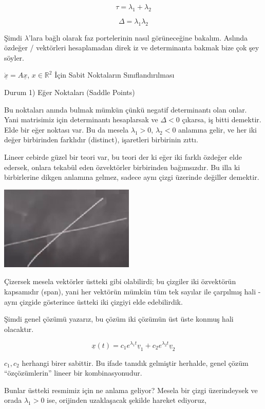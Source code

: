 \documentclass[12pt,fleqn]{article}\usepackage{../../common}
\begin{document}
$$ \tau = \lambda_1 + \lambda_2 $$

$$ \Delta = \lambda_1 \lambda_2 $$

Şimdi $\lambda$'lara bağlı olarak faz portelerinin nasıl görüneceğine
bakalım. Aslında özdeğer / vektörleri hesaplamadan direk iz ve determinanta
bakmak bize çok şey söyler. 

$\dot{\underline{x}}= A \underline{x}$, $x \in \mathbb{R}^2$ İçin Sabit Noktaların
Sınıflandırılması

Durum 1) Eğer Noktaları (Saddle Points)

Bu noktaları anında bulmak mümkün çünkü negatif determinantı olan onlar. Yani
matrisimiz için determinantı hesaplarsak ve $\Delta < 0$ çıkarsa, iş bitti
demektir. Elde bir eğer noktası var. Bu da mesela $\lambda_1 > 0$, $\lambda_2<0$
anlamına gelir, ve her iki değer birbirinden farklıdır (distinct), işaretleri
birbirinin zıttı.

Lineer cebirde güzel bir teori var, bu teori der ki eğer iki farklı özdeğer elde
edersek, onlara tekabül eden özvektörler birbirinden bağımsızdır. Bu illa ki
birbirlerine dikgen anlamına gelmez, sadece aynı çizgi üzerinde değiller
demektir. 

\includegraphics[height=4cm]{05_07.png}

Çizersek mesela vektörler üstteki gibi olabilirdi; bu çizgiler iki özvektörün
kapsamıdır (span), yani her vektörün mümkün tüm tek sayılar ile çarpılmış hali -
aynı çizgide gösterince üstteki iki çizgiyi elde edebilirdik.

Şimdi genel çözümü yazarız, bu çözüm iki çözümün üst üste konmuş hali
olacaktır.

$$
\underline{x}(t) =
c_1 e^{\lambda_1 t} \underline{v}_1 +
c_2 e^{\lambda_2 t} \underline{v}_2
$$

$c_1,c_2$ herhangi birer sabittir. Bu ifade tanıdık gelmiştir herhalde, genel
çözüm ``özçözümlerin'' lineer bir kombinasyonudur. 

Bunlar üstteki resmimiz için ne anlama geliyor? Mesela bir çizgi üzerindeysek
ve orada $\lambda_1 > 0$ ise, orijinden uzaklaşacak şekilde hareket ediyoruz, 
\end{document}
